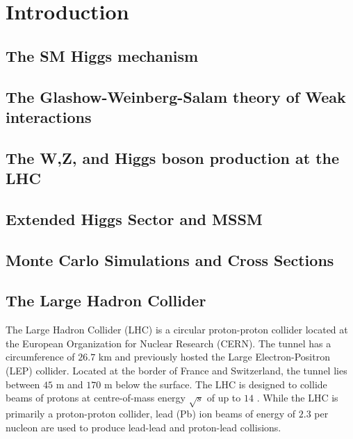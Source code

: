 \chapter{Introduction}

\section{The SM Higgs mechanism}

\section{The Glashow-Weinberg-Salam theory of Weak interactions}

\section{The W,Z, and Higgs boson production at the LHC}

\section{Extended Higgs Sector and MSSM}

\section{Monte Carlo Simulations and Cross Sections}
    
\section{The Large Hadron Collider}
The Large Hadron Collider (LHC)\cite{1748-0221-3-08-S08001} is a circular proton-proton collider located at the European Organization for Nuclear Research (CERN). The tunnel has a circumference of $26.7$ km and previously hosted the Large Electron-Positron (LEP)\cite{Myers:226776} collider. Located at the border of France and Switzerland, the tunnel lies between $45$ m and $170$ m below the surface. The LHC is designed to collide beams of protons at centre-of-mass energy $\sqrt{s}$ of up to $14$ \TeV. While the LHC is primarily a proton-proton collider, lead (Pb) ion beams of energy of $2.3$ \TeV per nucleon are used to produce lead-lead  and proton-lead collisions.  
 

